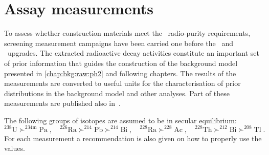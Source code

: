 
\chapter{Assay measurements}%
\label{apdx:assay}

To assess whether construction materials meet the \gerda\ radio-purity requirements,
screening measurement campaigns have been carried one before the \phasetwo\ and \phasetwop\
upgrades. The extracted radioactive decay activities constitute an important set of prior
information that guides the construction of the background model presented in
\cref{chap:bkg:raw:ph2} and following chapters. The results of the measurements are
converted to useful units for the characterisation of prior distributions in the
background model and other analyses. Part of these measurements are published also
in~\cite{Agostini2018a}.

The following groups of isotopes are assumed to be in secular equilibrium:
\[
  ^{238}\text{U}  \succ ^{234\text{m}}\text{Pa}               \;,\quad
  ^{226}\text{Ra} \succ ^{214}\text{Pb} \succ ^{214}\text{Bi} \;,\quad
  ^{228}\text{Ra} \succ ^{228}\text{Ac}                       \;,\quad
  ^{228}\text{Th} \succ ^{212}\text{Bi} \succ ^{208}\text{Tl} \;.
\]
For each measurement a recommendation is also given on how to properly use the values. 

\clearpage
\thispagestyle{empty}
\begin{sidewaystable}
  \caption{%
    Activity of \gerda\ \phasetwo\ components calculated from radio-purity screening
    measurements. Values in gray can be used as priors for \phasetwo\ background modeling
    as they are; values in yellow are (partly) derived from ICPMS/NAA measurements under
    the assumption of secular equilibrium in the U/Th decay chains; values in light blue
    have to be multiplied by 2/3. The latter is an approximation for the shortening of the
    cables before deployment in \gerda.
  }\label{tab:bkg:ph2:assay}
  
\end{sidewaystable}

